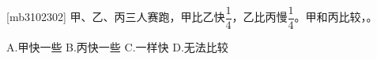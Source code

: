 [mb3102302]\quad
甲、乙、丙三人赛跑，甲比乙快$\dfrac{1}{4}$，乙比丙慢$\dfrac{1}{4}$。甲和丙比较，。 \par
\hspace{7em} A.甲快一些 \qquad B.丙快一些 \qquad C.一样快 \qquad D.无法比较 \par